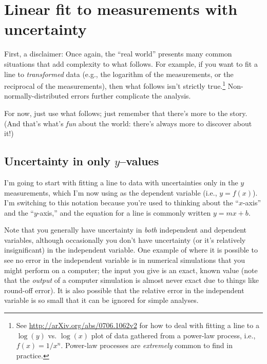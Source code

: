 \documentclass[10pt,letterpaper,twoside]{article}
\begin{document}
\section{Linear fit to measurements with uncertainty}
First, a disclaimer: Once again, the ``real world'' presents many common situations that add complexity to what follows.
For example, if you want to fit a line to \textit{transformed} data (e.g., the logarithm of the measurements, or the reciprocal of the measurements), then what follows isn't strictly true.\footnote{
See \url{http://arXiv.org/abs/0706.1062v2} for how to deal with fitting a line to a $\log(y)$ vs. $\log(x)$ plot of data gathered from a power-law process, i.e., $f(x)=1/x^n$.
Power-law processes are \textit{extremely} common to find in practice.
}
Non-normally-distributed errors further complicate the analysis.

For now, just use what follows; just remember that there's more to the story.
(And that's what's \textit{fun} about the world: there's always more to discover about it!)

\subsection{Uncertainty in only $y$--values}
I'm going to start with fitting a line to data with uncertainties only in the $y$ measurements, which I'm now using as the dependent variable (i.e., $y=f(x)$).
I'm switching to this notation because you're used to thinking about the ``$x$-axis'' and the ``$y$-axis,'' and the equation for a line is commonly written $y=mx+b$.

Note that you generally have uncertainty in \textit{both} independent and dependent variables, although occasionally you don't have uncertainty (or it's relatively insignificant) in the independent variable.
One example of where it is possible to see no error in the independent variable is in numerical simulations that you might perform on a computer; the input you give is an exact, known value (note that the \textit{output} of a computer simulation is almost never exact due to things like round-off error).
It is also possible that the relative error in the independent variable is so small that it can be ignored for simple analyses.
\end{document}
